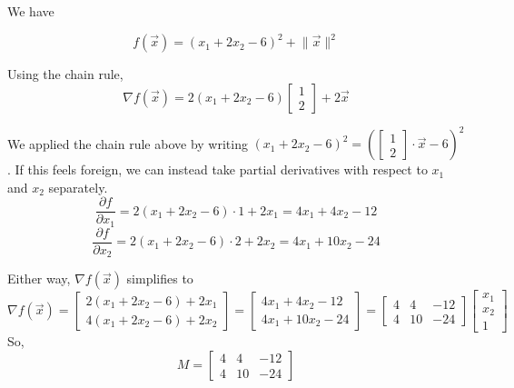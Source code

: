 \documentclass[11pt]{article}
\begin{document}
\begin{prob}
\begin{subprob}

\begin{solution}
We have

$$f(\vec x) = (x_1 + 2x_2 - 6)^2 + \lVert \vec x \rVert^2$$

Using the chain rule,
\[
\nabla f(\vec x)
=
2(x_1+2x_2-6)
\begin{bmatrix}
1\\
2
\end{bmatrix}
+
2\vec x
\]

We applied the chain rule above by writing $\left( x_1 + 2x_2 - 6 \right)^2 = (\begin{bmatrix} 1 \\ 2 \end{bmatrix} \cdot \vec x - 6)^2$. If this feels foreign, we can instead take partial derivatives with respect to $x_1$ and $x_2$ separately.
\[
\frac{\partial f}{\partial x_1} = 2(x_1 + 2x_2 - 6) \cdot 1 + 2x_1 = 4x_1 + 4x_2 - 12
\]
\[
\frac{\partial f}{\partial x_2} = 2(x_1 + 2x_2 - 6) \cdot 2 + 2x_2 = 4x_1 + 10x_2 - 24
\]

Either way, $\nabla f(\vec x)$ simplifies to
\[
\nabla f(\vec x)
=
\begin{bmatrix}
2(x_1+2x_2-6)+2x_1\\
4(x_1+2x_2-6)+2x_2
\end{bmatrix}
=
\begin{bmatrix}
4x_1+4x_2-12\\
4x_1+10x_2-24
\end{bmatrix}
= 
\begin{bmatrix}
4 & 4 & -12\\
4 & 10 & -24
\end{bmatrix}
\begin{bmatrix}
x_1 \\ x_2 \\ 1
\end{bmatrix}
\]
So,
\[
M =
\boxed{
\begin{bmatrix}
4 & 4 & -12\\
4 & 10 & -24
\end{bmatrix}}
\]
\end{solution}
\end{subprob}


\end{prob}
\end{document}
